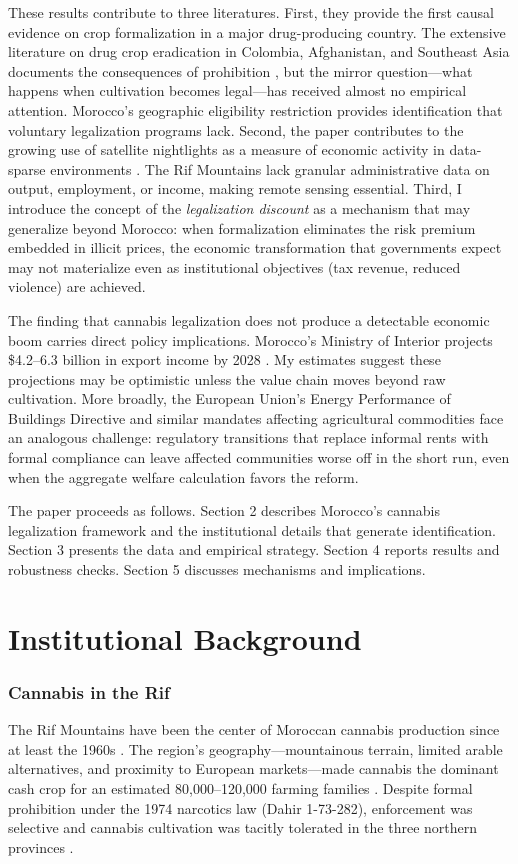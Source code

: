 \documentclass[12pt]{article}
\begin{document}
These results contribute to three literatures. First, they provide the first causal evidence on crop formalization in a major drug-producing country. The extensive literature on drug crop eradication in Colombia, Afghanistan, and Southeast Asia documents the consequences of prohibition \citep{Dube2016, Mejia2016}, but the mirror question---what happens when cultivation becomes legal---has received almost no empirical attention. Morocco's geographic eligibility restriction provides identification that voluntary legalization programs lack. Second, the paper contributes to the growing use of satellite nightlights as a measure of economic activity in data-sparse environments \citep{Henderson2012, Donaldson2016, Gibson2021}. The Rif Mountains lack granular administrative data on output, employment, or income, making remote sensing essential. Third, I introduce the concept of the \textit{legalization discount} as a mechanism that may generalize beyond Morocco: when formalization eliminates the risk premium embedded in illicit prices, the economic transformation that governments expect may not materialize even as institutional objectives (tax revenue, reduced violence) are achieved.

The finding that cannabis legalization does not produce a detectable economic boom carries direct policy implications. Morocco's Ministry of Interior projects \$4.2--6.3 billion in export income by 2028 \citep{MoroccaWorld2025}. My estimates suggest these projections may be optimistic unless the value chain moves beyond raw cultivation. More broadly, the European Union's Energy Performance of Buildings Directive and similar mandates affecting agricultural commodities face an analogous challenge: regulatory transitions that replace informal rents with formal compliance can leave affected communities worse off in the short run, even when the aggregate welfare calculation favors the reform.

The paper proceeds as follows. Section 2 describes Morocco's cannabis legalization framework and the institutional details that generate identification. Section 3 presents the data and empirical strategy. Section 4 reports results and robustness checks. Section 5 discusses mechanisms and implications.


\section{Institutional Background}

\subsubsection*{Cannabis in the Rif} The Rif Mountains have been the center of Moroccan cannabis production since at least the 1960s \citep{Chouvy2008}. The region's geography---mountainous terrain, limited arable alternatives, and proximity to European markets---made cannabis the dominant cash crop for an estimated 80,000--120,000 farming families \citep{UNODC2024}. Despite formal prohibition under the 1974 narcotics law (Dahir 1-73-282), enforcement was selective and cannabis cultivation was tacitly tolerated in the three northern provinces \citep{Afsahi2017}.
\end{document}
